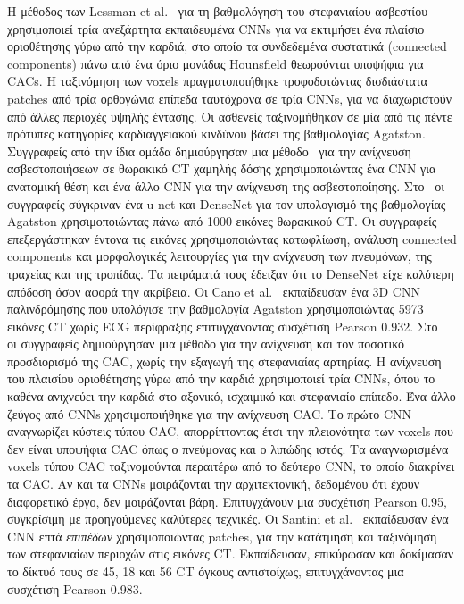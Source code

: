 Η μέθοδος των Lessman et al.~\cite{lessmann2016deep} για τη βαθμολόγηση του στεφανιαίου ασβεστίου χρησιμοποιεί τρία ανεξάρτητα εκπαιδευμένα CNNs για να εκτιμήσει ένα πλαίσιο οριοθέτησης γύρω από την καρδιά, στο οποίο τα συνδεδεμένα συστατικά (connected components) πάνω από ένα όριο μονάδας Hounsfield θεωρούνται υποψήφια για CACs.
Η ταξινόμηση των voxels πραγματοποιήθηκε τροφοδοτώντας δισδιάστατα patches από τρία ορθογώνια επίπεδα ταυτόχρονα σε τρία CNNs, για να διαχωριστούν από άλλες περιοχές υψηλής έντασης.
Οι ασθενείς ταξινομήθηκαν σε μία από τις πέντε πρότυπες κατηγορίες καρδιαγγειακού κινδύνου βάσει της βαθμολογίας Agatston.
Συγγραφείς από την ίδια ομάδα δημιούργησαν μια μέθοδο~\cite{lessmann2017automatic} για την ανίχνευση ασβεστοποιήσεων σε θωρακικό CT χαμηλής δόσης χρησιμοποιώντας ένα CNN για ανατομική θέση και ένα άλλο CNN για την ανίχνευση της ασβεστοποίησης.
Στο~\cite{shadmi2018fully} οι συγγραφείς σύγκριναν ένα u-net και DenseNet για τον υπολογισμό της βαθμολογίας Agatston χρησιμοποιώντας πάνω από 1000 εικόνες θωρακικού CT\@.
Οι συγγραφείς επεξεργάστηκαν έντονα τις εικόνες χρησιμοποιώντας κατωφλίωση, ανάλυση connected components και μορφολογικές λειτουργίες για την ανίχνευση των πνευμόνων, της τραχείας και της τροπίδας.
Τα πειράματά τους έδειξαν ότι το DenseNet είχε καλύτερη απόδοση όσον αφορά την ακρίβεια.
Οι Cano et al.~\cite{cano2018automated} εκπαίδευσαν ένα 3D CNN παλινδρόμησης που υπολόγισε την βαθμολογία Agatston χρησιμοποιώντας 5973 εικόνες CT χωρίς ECG περίφραξης επιτυγχάνοντας συσχέτιση Pearson 0.932.
Στο~\cite{wolterink2016automatic} οι συγγραφείς δημιούργησαν μια μέθοδο για την ανίχνευση και τον ποσοτικό προσδιορισμό της CAC, χωρίς την εξαγωγή της στεφανιαίας αρτηρίας.
Η ανίχνευση του πλαισίου οριοθέτησης γύρω από την καρδιά χρησιμοποιεί τρία CNNs, όπου το καθένα ανιχνεύει την καρδιά στο αξονικό, ισχαιμικό και στεφανιαίο επίπεδο.
Ένα άλλο ζεύγος από CNNs χρησιμοποιήθηκε για την ανίχνευση CAC\@.
Το πρώτο CNN αναγνωρίζει κύστεις τύπου CAC, απορρίπτοντας έτσι την πλειονότητα των voxels που δεν είναι υποψήφια CAC όπως ο πνεύμονας και ο λιπώδης ιστός.
Τα αναγνωρισμένα voxels τύπου CAC ταξινομούνται περαιτέρω από το δεύτερο CNN, το οποίο διακρίνει τα CAC\@.
Αν και τα CNNs μοιράζονται την αρχιτεκτονική, δεδομένου ότι έχουν διαφορετικό έργο, δεν μοιράζονται βάρη.
Επιτυγχάνουν μια συσχέτιση Pearson 0.95, συγκρίσιμη με προηγούμενες καλύτερες τεχνικές.
Οι Santini et al.~\cite{santini2017automatic} εκπαίδευσαν ένα CNN επτά \textit{επιπέδων} χρησιμοποιώντας patches, για την κατάτμηση και ταξινόμηση των στεφανιαίων περιοχών στις εικόνες CT\@.
Εκπαίδευσαν, επικύρωσαν και δοκίμασαν το δίκτυό τους σε 45, 18 και 56 CT όγκους αντιστοίχως, επιτυγχάνοντας μια συσχέτιση Pearson 0.983.

